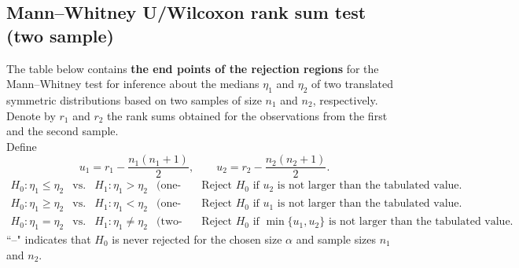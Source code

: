 \newpage
\subsection{Mann--Whitney U/Wilcoxon rank sum test (two sample)}
\noindent The table below contains \textbf{the end points of the rejection regions} for the Mann--Whitney test for inference about the medians $\eta_1$ and $\eta_2$ of two translated symmetric distributions based on two samples of size $n_1$ and $n_2$, respectively.\\[5pt]
Denote by $r_1$ and $r_2$ the rank sums obtained for the observations from the first and the second sample. \\[5pt]
Define
\[
u_1=r_1-\frac{n_1(n_1+1)}{2},
\qquad
u_2=r_2-\frac{n_2(n_2+1)}{2}.
\]
\[
\begin{array}{rclll}
	H_0:\eta_1\le\eta_2 & \text{vs.} & H_1:\eta_1>\eta_2
	& \text{(one-sided):} & \text{Reject $H_0$ if $u_2$ is not larger than the tabulated value.}\\
	H_0:\eta_1\ge\eta_2 & \text{vs.} & H_1:\eta_1<\eta_2
	& \text{(one-sided):} & \text{Reject $H_0$ if $u_1$ is not larger than the tabulated value.}\\
	H_0:\eta_1=\eta_2 & \text{vs.} & H_1:\eta_1\ne\eta_2
	& \text{(two-sided):} & \text{Reject $H_0$ if $\min\{u_1,u_2\}$ is not larger than the tabulated value.}
\end{array}
\]
``--" indicates that $H_0$ is never rejected for the chosen size $\alpha$
and sample sizes $n_1$ and $n_2$.

~\\

